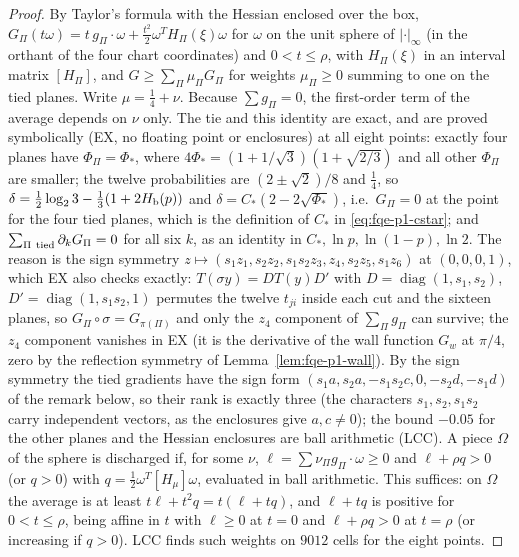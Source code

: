 \begin{proof}
By Taylor's formula with the Hessian enclosed over the box, $G_\Pi(t\omega)=t\,g_\Pi\!\cdot\!\omega+\frac{t^2}2\omega^T H_\Pi(\xi)\omega$
for $\omega$ on the unit sphere of $|\cdot|_\infty$ (in the orthant of the four chart coordinates) and $0<t\le\rho$, with
$H_\Pi(\xi)$ in an interval matrix $[H_\Pi]$, and $G\ge\sum_\Pi\mu_\Pi G_\Pi$ for weights $\mu_\Pi\ge0$ summing to one on the tied planes.
Write $\mu=\frac14+\nu$.  Because $\sum g_\Pi=0$, the first-order term of the average depends on $\nu$ only.  The tie and this identity are exact, and
are proved symbolically (EX, no floating point or enclosures) at all eight points: exactly four planes have $\Phi_\Pi=\Phi_*$, where
$4\Phi_*=(1+1/\sqrt3)(1+\sqrt{2/3})$ and all other $\Phi_\Pi$ are smaller; the twelve probabilities are $(2\pm\sqrt2)/8$ and $\frac14$, so
$\delta=\frac12\log_23-\frac13(1+2H_{\rm b}(p))$ and $\delta=C_*(2-2\sqrt{\Phi_*})$, i.e.\ $G_\Pi=0$ at the point for the four tied planes, which
is the definition of $C_*$ in \eqref{eq:fqe-p1-cstar}; and $\sum_{\Pi\ \rm tied}\partial_kG_\Pi=0$ for all six $k$, as an identity in
$C_*,\ln p,\ln(1-p),\ln2$.  The reason is the sign symmetry
$z\mapsto(s_1z_1,s_2z_2,s_1s_2z_3,z_4,s_2z_5,s_1z_6)$ at $(0,0,0,1)$, which EX also checks exactly: $T(\sigma y)=DT(y)D'$ with
$D=\operatorname{diag}(1,s_1,s_2)$, $D'=\operatorname{diag}(1,s_1s_2,1)$ permutes the twelve $t_{ji}$ inside each cut and the sixteen
planes, so $G_\Pi\circ\sigma=G_{\pi(\Pi)}$ and only the $z_4$ component of $\sum_\Pi g_\Pi$ can survive; the $z_4$ component vanishes in EX
(it is the derivative of the wall function $G_w$ at $\pi/4$, zero by the reflection symmetry of Lemma~\ref{lem:fqe-p1-wall}).  By the sign symmetry the tied
gradients have the sign form $(s_1a,s_2a,-s_1s_2c,0,-s_2d,-s_1d)$ of the remark below, so their rank is exactly three
(the characters $s_1,s_2,s_1s_2$ carry independent vectors, as the enclosures give $a,c\ne0$); the bound $-0.05$ for the other planes
and the Hessian enclosures are ball arithmetic (LCC).  A piece $\Omega$ of the sphere is
discharged if, for some $\nu$, $\ell=\sum\nu_\Pi g_\Pi\!\cdot\!\omega\ge0$ and $\ell+\rho q>0$ (or $q>0$) with
$q=\frac12\omega^T[H_\mu]\omega$, evaluated in ball arithmetic. This suffices: on $\Omega$ the average is at least
$t\ell+t^2q=t(\ell+tq)$, and $\ell+tq$ is positive for $0<t\le\rho$, being affine in $t$ with $\ell\ge0$ at $t=0$ and
$\ell+\rho q>0$ at $t=\rho$ (or increasing if $q>0$).  LCC finds such weights on $9012$ cells for the eight points.
\end{proof}


